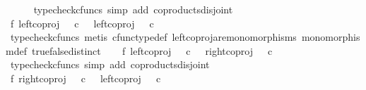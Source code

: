 \begin{isabellebody}
\ \ \ \ \isamarkupfalse%
\ {\isacharparenleft}{\kern0pt}typecheck{\isacharunderscore}{\kern0pt}cfuncs{\isacharcomma}{\kern0pt}\ simp\ add{\isacharcolon}{\kern0pt}\ coproducts{\isacharunderscore}{\kern0pt}disjoint{\isacharparenright}{\kern0pt}\isanewline
\ \ \isamarkupfalse%
\ f{}{\isacharcolon}{\kern0pt}\ {\isachardoublequoteopen}{\isacharparenleft}{\kern0pt}left{\isacharunderscore}{\kern0pt}coproj\ {\isasymOmega}\ {\isasymOmega}{\isacharparenright}{\kern0pt}\ {\isasymcirc}\isactrlsub c\ {\isasymt}\ {\isasymnoteq}\ {\isacharparenleft}{\kern0pt}left{\isacharunderscore}{\kern0pt}coproj\ {\isasymOmega}\ {\isasymOmega}{\isacharparenright}{\kern0pt}\ {\isasymcirc}\isactrlsub c\ {\isasymf}{\isachardoublequoteclose}\isanewline
\ \ \ \ \isamarkupfalse%
\ {\isacharparenleft}{\kern0pt}typecheck{\isacharunderscore}{\kern0pt}cfuncs{\isacharcomma}{\kern0pt}\ metis\ cfunc{\isacharunderscore}{\kern0pt}type{\isacharunderscore}{\kern0pt}def\ left{\isacharunderscore}{\kern0pt}coproj{\isacharunderscore}{\kern0pt}are{\isacharunderscore}{\kern0pt}monomorphisms\ monomorphism{\isacharunderscore}{\kern0pt}def\ true{\isacharunderscore}{\kern0pt}false{\isacharunderscore}{\kern0pt}distinct{\isacharparenright}{\kern0pt}\isanewline
\ \ \isamarkupfalse%
\ f{}{\isacharcolon}{\kern0pt}\ {\isachardoublequoteopen}{\isacharparenleft}{\kern0pt}left{\isacharunderscore}{\kern0pt}coproj\ {\isasymOmega}\ {\isasymOmega}{\isacharparenright}{\kern0pt}\ {\isasymcirc}\isactrlsub c\ {\isasymt}\ {\isasymnoteq}\ {\isacharparenleft}{\kern0pt}right{\isacharunderscore}{\kern0pt}coproj\ {\isasymOmega}\ {\isasymOmega}{\isacharparenright}{\kern0pt}\ {\isasymcirc}\isactrlsub c\ {\isasymf}{\isachardoublequoteclose}\isanewline
\ \ \ \ \isamarkupfalse%
\ {\isacharparenleft}{\kern0pt}typecheck{\isacharunderscore}{\kern0pt}cfuncs{\isacharcomma}{\kern0pt}\ simp\ add{\isacharcolon}{\kern0pt}\ coproducts{\isacharunderscore}{\kern0pt}disjoint{\isacharparenright}{\kern0pt}\isanewline
\ \ \isamarkupfalse%
\ f{}{\isacharcolon}{\kern0pt}\ {\isachardoublequoteopen}{\isacharparenleft}{\kern0pt}right{\isacharunderscore}{\kern0pt}coproj\ {\isasymOmega}\ {\isasymOmega}{\isacharparenright}{\kern0pt}\ {\isasymcirc}\isactrlsub c\ {\isasymt}\ {\isasymnoteq}\ {\isacharparenleft}{\kern0pt}left{\isacharunderscore}{\kern0pt}coproj\ {\isasymOmega}\ {\isasymOmega}{\isacharparenright}{\kern0pt}\ {\isasymcirc}\isactrlsub c\ {\isasymf}{\isachardoublequoteclose}\isanewline
\ \ \ \ \isamarkupfalse%

\end{isabellebody}
